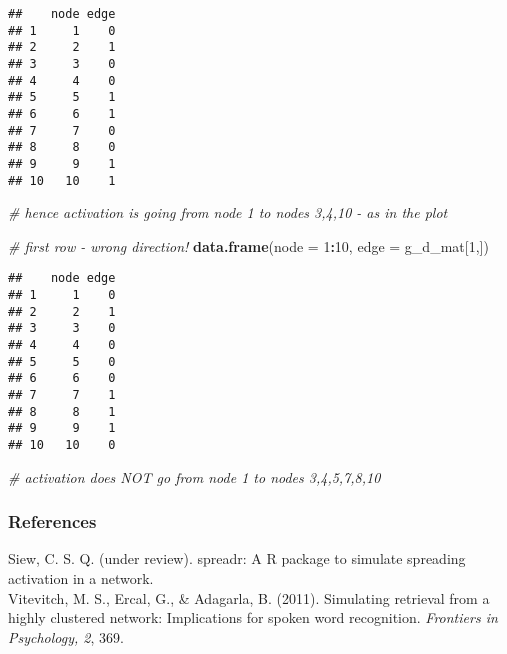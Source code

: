 \documentclass[]{article}
\newenvironment{Shaded}{\begin{snugshade}}{\end{snugshade}}
\newcommand{\KeywordTok}[1]{\textcolor[rgb]{0.13,0.29,0.53}{\textbf{#1}}}
\newcommand{\DataTypeTok}[1]{\textcolor[rgb]{0.13,0.29,0.53}{#1}}
\newcommand{\DecValTok}[1]{\textcolor[rgb]{0.00,0.00,0.81}{#1}}
\newcommand{\CommentTok}[1]{\textcolor[rgb]{0.56,0.35,0.01}{\textit{#1}}}
\newcommand{\OperatorTok}[1]{\textcolor[rgb]{0.81,0.36,0.00}{\textbf{#1}}}
\newcommand{\NormalTok}[1]{#1}
\begin{document}
\begin{verbatim}
##    node edge
## 1     1    0
## 2     2    1
## 3     3    0
## 4     4    0
## 5     5    1
## 6     6    1
## 7     7    0
## 8     8    0
## 9     9    1
## 10   10    1
\end{verbatim}

\begin{Shaded}
\begin{Highlighting}[]
\CommentTok{# hence activation is going from node 1 to nodes 3,4,10 - as in the plot }

\CommentTok{# first row - wrong direction!}
\KeywordTok{data.frame}\NormalTok{(}\DataTypeTok{node =} \DecValTok{1}\OperatorTok{:}\DecValTok{10}\NormalTok{, }\DataTypeTok{edge =}\NormalTok{ g_d_mat[}\DecValTok{1}\NormalTok{,])}
\end{Highlighting}
\end{Shaded}

\begin{verbatim}
##    node edge
## 1     1    0
## 2     2    1
## 3     3    0
## 4     4    0
## 5     5    0
## 6     6    0
## 7     7    1
## 8     8    1
## 9     9    1
## 10   10    0
\end{verbatim}

\begin{Shaded}
\begin{Highlighting}[]
\CommentTok{# activation does NOT go from node 1 to nodes 3,4,5,7,8,10}
\end{Highlighting}
\end{Shaded}

\subsubsection{References}\label{references}

Siew, C. S. Q. (under review). spreadr: A R package to simulate
spreading activation in a network.\\
Vitevitch, M. S., Ercal, G., \& Adagarla, B. (2011). Simulating
retrieval from a highly clustered network: Implications for spoken word
recognition. \emph{Frontiers in Psychology, 2}, 369.
\end{document}
